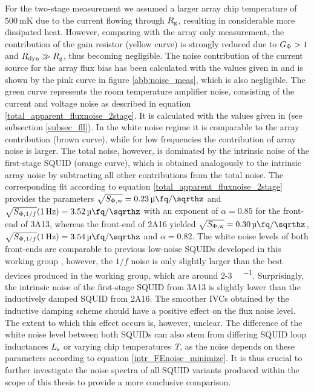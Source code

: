 For the two-stage measurement we assumed a larger array chip temperature of $\qty{500}{\milli\kelvin}$ due to the current flowing through $R_{\rm g}$, resulting in considerable more dissipated heat. However, comparing with the array only measurement, the contribution of the gain resistor (yellow curve) is strongly reduced due to $G_{\rm \Phi}>1$ and $R_{\rm dyn}\gg R_{\rm g}$, thus becoming negligible. The noise contribution of the current source for the array flux bias has been calculated with the values given in \cite{Kaap2020} and is shown by the pink curve in figure \ref{abb:noise_meas}, which is also negligible. The green curve represents the room temperature amplifier noise, consisting of the current and voltage noise as described in equation \ref{total_apparent_fluxnoise_2stage}. It is calculated with the values given in \cite{Drung2006} (see subsection \ref{subsec_fll}). In the white noise regime it is comparable to the array contribution (brown curve), while for low frequencies the contribution of array noise is larger. The total noise, however, is dominated by the intrinsic noise of the first-stage SQUID (orange curve), which is obtained analogously to the intrinsic array noise by subtracting all other contributions from the total noise. The corresponding fit according to equation \ref{total_apparent_fluxnoise_2stage} provides the parameters $\sqrt{S_{\rm \Phi,w}}=\qty{0.23}{\micro\fq\per\sqrthz}$ and $\sqrt{S_{{\rm \Phi},1/f}}(\qty{1}{\Hz})=\qty{3.52}{\micro\fq\per\sqrthz}$ with an exponent of $\alpha=0.85$ for the front-end of 3A13, whereas the front-end of 2A16 yielded $\sqrt{S_{\rm \Phi,w}}=\qty{0.30}{\micro\fq\per\sqrthz}$, $\sqrt{S_{{\rm \Phi},1/f}}(\qty{1}{\Hz})=\qty{3.54}{\micro\fq\per\sqrthz}$ and $\alpha=0.82$. The white noise levels of both front-ends are comparable to previous low-noise SQUIDs developed in this working group \cite{Ferring2015}, however, the $1/f$ noise is only slightly larger than the best devices produced in the working group, which are around 2-3 \unit{\micro\fq\per\sqrthz}. Surprisingly, the intrinsic noise of the first-stage SQUID from 3A13 is slightly lower than the inductively damped SQUID from 2A16. The smoother IVCs obtained by the inductive damping scheme should have a positive effect on the flux noise level. The extent to which this effect occurs is, however, unclear. The difference of the white noise level between both SQUIDs can also stem from differing SQUID loop inductances $L_{\rm s}$ or varying chip temperatures \textit{T}, as the noise depends on these parameters according to equation \ref{intr_FEnoise_minimize}. It is thus crucial to further investigate the noise spectra of all SQUID variants produced within the scope of this thesis to provide a more conclusive comparison.

